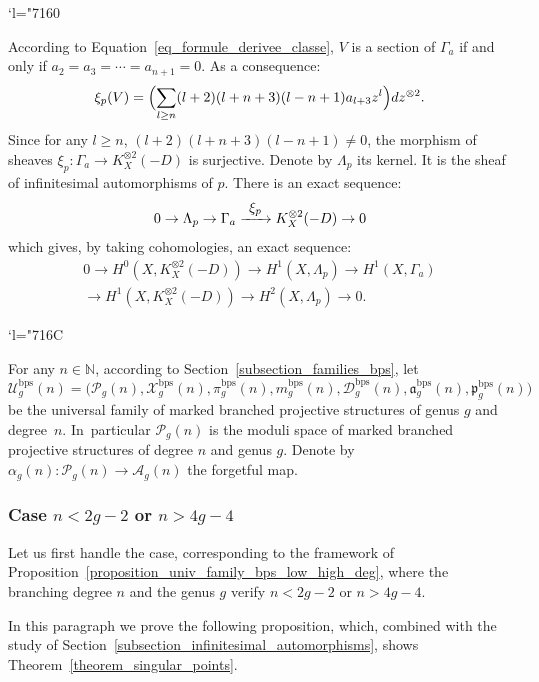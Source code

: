 \documentclass[10pt]{amsart}
\newcommand{\Changel}{\mathcode`l="7160}
\newcommand{\Changelback}{\mathcode`l="716C}
\newcommand\To[1]{\mathchoice{\xrightarrow{\textstyle\kern4pt#1\kern3pt}}{\stackrel{#1}{\longrightarrow}}{}{}}
\newcommand{\N}{\mathbb N}
\newcommand{\BPS}{\mathrm{bps}}
\theoremstyle{definition}
\theoremstyle{plain}
\begin{document}
\Changel

\noindent
According to Equation~\eqref{eq_formule_derivee_classe}, $V$ is a section of $\Gamma_a$ if and only if \hbox{$a_2 \!=\! a_3 \!=\! \cdots \!=\! a_{n+1} \!=\! 0$}. As a consequence:
\begin{equation}\label{eq_xi_p}
\xi_p(V) = \Bigl(\sum_{l \ge n}(l+2)(l+n+3)(l-n+1)a_{l+3}z^l\Bigr)dz^{\otimes 2}.
\end{equation}
Since for any $l \ge n$, $(l+2)(l+n+3)(l-n+1) \neq 0$, the morphism of sheaves $\xi_p: \Gamma_a \to K_X^{\otimes 2}(-D)$ is surjective.
Denote by $\Lambda_p$ its kernel.
It is the sheaf of infinitesimal automorphisms of $p$.
There is an exact sequence:
\begin{equation*}
0 \to \Lambda_p \to \Gamma_a \To{\xi_p} K_X^{\otimes 2}(-D) \to 0
\end{equation*}
which gives, by taking cohomologies, an exact sequence:
\begin{multline}\label{eq_exact_cohom_struct}
0 \to H^0\left(X, K_X^{\otimes 2}(-D)\right) \to H^1(X, \Lambda_p) \to H^1\left(X, \Gamma_a\right)\\
\to H^1\left(X, K_X^{\otimes 2}(-D)\right) \to H^2(X, \Lambda_p) \to 0.
\end{multline}

\Changelback

For any $n \in \N$, according to Section~\ref{subsection_families_bps}, let
\[
\mathcal U_g^{\BPS}(n) = \bigl(\mathcal P_g(n), \mathcal X_g^{\BPS}(n), \pi_g^{\BPS}(n), m_g^{\BPS}(n), \mathcal D_g^{\BPS}(n), \mathfrak a_g^{\BPS}(n), \mathfrak p_g^{\BPS}(n)\bigr)
\]
be the universal family of marked branched projective structures of genus $g$ and degree~$n$. In~particular $\mathcal P_g(n)$ is the moduli space of marked branched projective structures of degree $n$ and genus $g$.
Denote by $\alpha_g(n): \mathcal P_g(n) \to \mathcal A_g(n)$ the forgetful map.

\subsubsection{Case $n < 2g-2$ or $n > 4g-4$}\label{subsubsection_singular_points_small_high_degree}

Let us first handle the case, corresponding to the framework of Proposition~\ref{proposition_univ_family_bps_low_high_deg}, where the branching degree $n$ and the genus $g$ verify $n < 2g-2$ or $n > 4g-4$.

In this paragraph we prove the following proposition, which, combined with the study of Section~\ref{subsection_infinitesimal_automorphisms}, shows Theorem~\ref{theorem_singular_points}.
\end{document}
